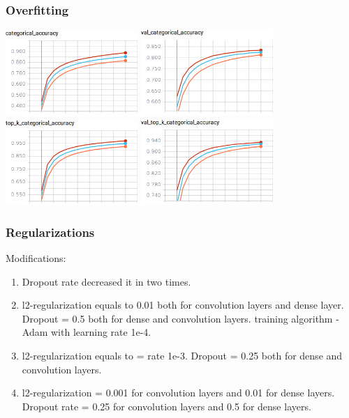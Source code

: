\documentclass[14pt]{beamer}
\begin{document}
		\begin{frame}
			\frametitle{Overfitting}
			\hfil\hfil\includegraphics[width=5cm]{part4//3CNN_train_category_accuracy}
			\hfil\hfil\includegraphics[width=5cm]{part4//3CNN_val_category_accuracy}\newline
			\vfil
			\hfil\hfil\includegraphics[width=5cm]{part4/3CNN_train_top_k_accuracy}
			\hfil\hfil\includegraphics[width=5cm]{part4/3CNN_val_top_k_accuracy}\newline
		\end{frame}
		
		
	\begin{frame}
		\frametitle{Regularizations}
		Modifications:
		\begin{enumerate}
			\item Dropout rate decreased it in two times.
			\item l2-regularization equals to 0.01 both for convolution layers and dense layer. 
			Dropout = 0.5 both for dense and convolution layers. 
		    training algorithm - Adam with learning rate 1e-4. 
			\item l2-regularization equals to = rate 1e-3. 
			Dropout = 0.25 both for dense and convolution layers. 
			\item l2-regularization =  0.001 for convolution layers and 0.01 for dense layers. 
			Dropout rate = 0.25 for convolution layers and 0.5 for dense layers.
		\end{enumerate}
	\end{frame}
			
\end{document}
